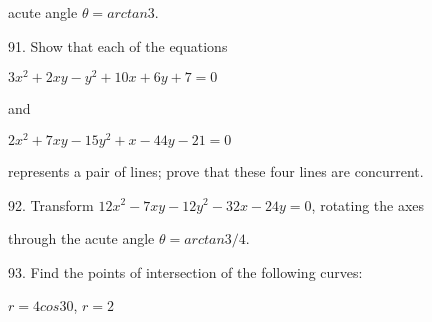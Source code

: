 \documentclass[10.5pt,a4paper]{article}
\begin{document}
\hspace{0.5cm} acute angle $\theta=arctan 3$.\vspace{0.25cm}

91. Show that each of the equations

\begin{center}
$3x^2+2xy-y^2+10x+6y+7=0$ 
\end{center}
\hspace{0.5cm} and
\begin{center}
$2x^2+7xy-15y^2+x-44y-21=0$ 
\end{center}

\hspace{0.6cm} represents a pair of lines; prove that these four lines are concurrent. \vspace{0.25cm}

92. Transform $12x^2-7xy-12y^2-32x-24y=0$, rotating the axes \vspace{0.25cm}

\hspace{0.5cm} through the acute angle $\theta=arctan3/4$. \vspace{0.25cm}

93. Find the points of intersection of the following curves: 
\begin{center}
$r=4cos30$, \hspace{0.5cm} $r=2$
\end{center}
\end{document}
